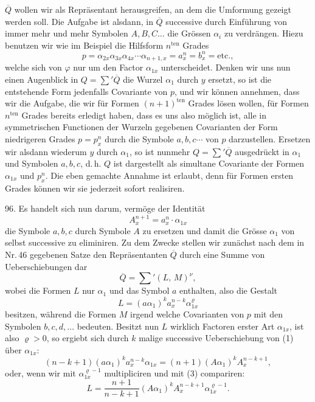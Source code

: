 \documentclass[11pt]{article}
\providecommand{\weberpage}[1]{}
\providecommand{\weq}[2]{\begin{equation}\tag{#1}#2\end{equation}}
\begin{document}
\weberpage{102}
$\overline{Q}$ wollen wir als Repräsentant herausgreifen, an dem die Umformung gezeigt werden soll. Die Aufgabe ist alsdann, in $\overline{Q}$ successive durch Einführung von immer mehr und mehr Symbolen $A, B, C\ldots$ die Grössen $\alpha_i$ zu verdrängen. Hiezu benutzen wir wie im Beispiel die Hilfsform $n^{\text{ten}}$ Grades
\[
p = \alpha_{2x}\alpha_{3x}\alpha_{4x}\cdots\alpha_{n+1,x} = a_x^n = b_x^n = \text{etc.},
\]
welche sich von $\varphi$ nur um den Factor $\alpha_{1x}$ unterscheidet. Denken wir uns nun einen Augenblick in $Q = \sum{}' \overline{Q}$ die Wurzel $\alpha_1$ durch $y$ ersetzt, so ist die entstehende Form jedenfalls Covariante von $p$, und wir können annehmen, dass wir die Aufgabe, die wir für Formen $(n+1)^{\text{ten}}$ Grades lösen wollen, für Formen $n^{\text{ten}}$ Grades bereits erledigt haben, dass es uns also möglich ist, alle in symmetrischen Functionen der Wurzeln gegebenen Covarianten der Form niedrigeren Grades $p = p_x^n$ durch die Symbole $a, b, c\cdots$ von $p$ darzustellen. Ersetzen wir alsdann wiederum $y$ durch $\alpha_1$, so ist nunmehr $Q = \sum{}' \overline{Q}$ ausgedrückt in $\alpha_1$ und Symbolen $a, b, c$, d.\,h. $Q$ ist dargestellt als simultane Covariante der Formen $\alpha_{1x}$ und $p_x^n$. Die eben gemachte Annahme ist erlaubt, denn für Formen ersten Grades können wir sie jederzeit sofort realisiren.

96. Es handelt sich nun darum, vermöge der Identität
\weq{1}{A_x^{n+1} = a_x^n \cdot \alpha_{1x}}
die Symbole $a, b, c$ durch Symbole $A$ zu ersetzen und damit die Grösse $\alpha_1$ von selbst successive zu eliminiren. Zu dem Zwecke stellen wir zunächst nach dem in Nr.\,46 gegebenen Satze den Repräsentanten $\overline{Q}$ durch eine Summe von Ueberschiebungen dar
\weq{2}{\overline{Q} = \sum{}' (L,\,M)^\nu,}
wobei die Formen $L$ nur $\alpha_1$ und das Symbol $a$ enthalten, also die Gestalt
\weq{3}{L = (a\alpha_1)^k a_x^{n-k} \alpha_{1x}^\varrho}
besitzen, während die Formen $M$ irgend welche Covarianten von $p$ mit den Symbolen $b, c, d,\ldots$ bedeuten. Besitzt nun $L$ wirklich Factoren erster Art $\alpha_{1x}$, ist also $\varrho > 0$, so ergiebt sich durch $k$ malige successive Ueberschiebung von (1) über $\alpha_{1x}$:
\weq{4}{(n-k+1)(a\alpha_1)^k a_x^{n-k} \alpha_{1x} = (n+1)(A\alpha_1)^k A_x^{n-k+1},}
oder, wenn wir mit $\alpha_{1x}^{\varrho-1}$ multipliciren und mit (3) compariren:
\[
L = \frac{n+1}{n-k+1}(A\alpha_1)^k A_x^{n-k+1}\alpha_{1x}^{\varrho-1}.
\]
\end{document}
